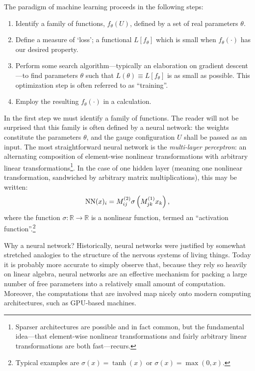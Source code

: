 \documentclass[12pt]{article}
\begin{document}
The paradigm of machine learning proceeds in the following steps:
\begin{enumerate}
    \item Identify a family of functions, $f_\theta(U)$,
    defined by a set of real parameters $\theta$.
    \item Define a measure of `loss'; a functional $L[f_\theta]$ which is small when $f_\theta(\cdot)$ has our desired property.
    \item Perform some search algorithm---typically an elaboration on gradient descent---to find parameters $\theta$ such that $L(\theta) \equiv L[f_\theta]$ is as small as possible. This optimization step is often referred to as ``training''.
    \item Employ the resulting $f_\theta(\cdot)$ in a calculation.
\end{enumerate}
In the first step we must identify a family of functions. The reader will not be surprised that this family is often defined by a neural network: the weights constitute the parameters $\theta$, and the gauge configuration $U$ shall be passed as an input. The most straightforward neural network is the \emph{multi-layer perceptron}: an alternating composition of element-wise nonlinear transformations with arbitrary linear transformations\footnote{Sparser architectures are possible and in fact common, but the fundamental idea---that element-wise nonlinear transformations and fairly arbitrary linear transformations are both fast---recurs.}. In the case of one hidden layer (meaning one nonlinear transformation, sandwiched by arbitrary matrix multiplications), this may be written:
\begin{equation}
    \mathrm{NN}(x)_i =
    M^{(2)}_{ij} \sigma\left(M^{(1)}_{jk} x_k\right)
    \text,
\end{equation}
where the function $\sigma : \mathbb R \rightarrow \mathbb R$ is 
a nonlinear function, termed an ``activation function''.\footnote{Typical examples are $\sigma(x) = \tanh(x)$ or $\sigma(x) = \max(0, x)$.}

Why a neural network? Historically, neural networks were justified by somewhat stretched analogies to the structure of the nervous systems of living things. Today it is probably more accurate to simply observe that, because they rely so heavily on linear algebra, neural networks are an effective mechanism for packing a large number of free parameters into a relatively small amount of computation. Moreover, the computations that are involved map nicely onto modern computing architectures, such as GPU-based machines.
\end{document}
